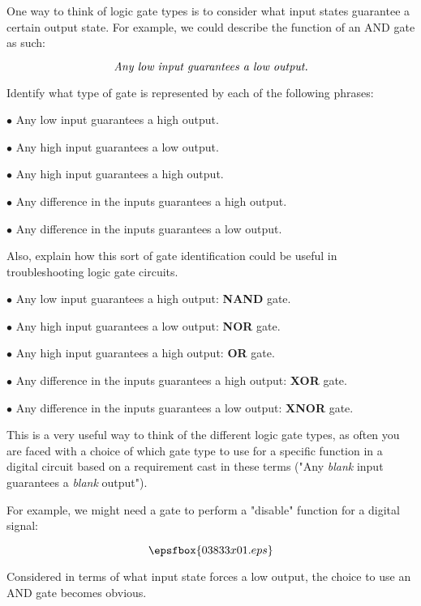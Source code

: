 

One way to think of logic gate types is to consider what input states guarantee a certain output state.  For example, we could describe the function of an AND gate as such:

$$\hbox{\it Any low input guarantees a low output.}$$

Identify what type of gate is represented by each of the following phrases:

\medskip
\item{$\bullet$} Any low input guarantees a high output.
\item{$\bullet$} Any high input guarantees a low output.
\item{$\bullet$} Any high input guarantees a high output.
\item{$\bullet$} Any difference in the inputs guarantees a high output.
\item{$\bullet$} Any difference in the inputs guarantees a low output.
\medskip

Also, explain how this sort of gate identification could be useful in troubleshooting logic gate circuits.







\medskip
\item{$\bullet$} Any low input guarantees a high output: {\bf NAND} gate.
\item{$\bullet$} Any high input guarantees a low output: {\bf NOR} gate.
\item{$\bullet$} Any high input guarantees a high output: {\bf OR} gate.
\item{$\bullet$} Any difference in the inputs guarantees a high output: {\bf XOR} gate.
\item{$\bullet$} Any difference in the inputs guarantees a low output: {\bf XNOR} gate.
\medskip







This is a very useful way to think of the different logic gate types, as often you are faced with a choice of which gate type to use for a specific function in a digital circuit based on a requirement cast in these terms ("Any {\it blank} input guarantees a {\it blank} output").

For example, we might need a gate to perform a "disable" function for a digital signal:

$$\epsfbox{03833x01.eps}$$

Considered in terms of what input state forces a low output, the choice to use an AND gate becomes obvious.




